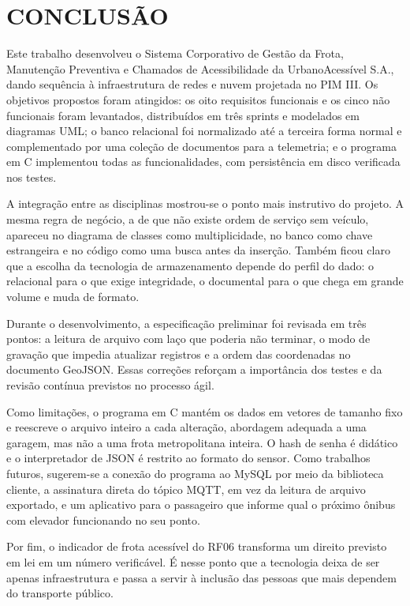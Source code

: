 \documentclass[12pt,a4paper,oneside]{report}
\begin{document}
\chapter{CONCLUSÃO}\label{cap:conclusao}

Este trabalho desenvolveu o Sistema Corporativo de Gestão da Frota, Manutenção Preventiva e Chamados de
Acessibilidade da UrbanoAcessível S.A., dando sequência à infraestrutura de redes e nuvem projetada no
PIM III. Os objetivos propostos foram atingidos: os oito requisitos funcionais e os cinco não funcionais
foram levantados, distribuídos em três sprints e modelados em diagramas UML; o banco relacional foi
normalizado até a terceira forma normal e complementado por uma coleção de documentos para a telemetria;
e o programa em C implementou todas as funcionalidades, com persistência em disco verificada nos testes.

A integração entre as disciplinas mostrou-se o ponto mais instrutivo do projeto. A mesma regra de
negócio, a de que não existe ordem de serviço sem veículo, apareceu no diagrama de classes como
multiplicidade, no banco como chave estrangeira e no código como uma busca antes da inserção. Também
ficou claro que a escolha da tecnologia de armazenamento depende do perfil do dado: o relacional para o
que exige integridade, o documental para o que chega em grande volume e muda de formato.

Durante o desenvolvimento, a especificação preliminar foi revisada em três pontos: a leitura de arquivo
com laço que poderia não terminar, o modo de gravação que impedia atualizar registros e a ordem das
coordenadas no documento GeoJSON. Essas correções reforçam a importância dos testes e da revisão contínua
previstos no processo ágil.

Como limitações, o programa em C mantém os dados em vetores de tamanho fixo e reescreve o arquivo inteiro a
cada alteração, abordagem adequada a uma garagem, mas não a uma frota metropolitana inteira. O hash de
senha é didático e o interpretador de JSON é restrito ao formato do sensor. Como trabalhos futuros,
sugerem-se a conexão do programa ao MySQL por meio da biblioteca cliente, a assinatura direta do tópico
MQTT, em vez da leitura de arquivo exportado, e um aplicativo para o passageiro que informe qual o próximo
ônibus com elevador funcionando no seu ponto.

Por fim, o indicador de frota acessível do RF06 transforma um direito previsto em lei em um número
verificável. É nesse ponto que a tecnologia deixa de ser apenas infraestrutura e passa a servir à
inclusão das pessoas que mais dependem do transporte público.
\end{document}
